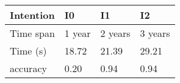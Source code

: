 \begin{tabular}{llll}
\toprule
Intention & I0 & I1 & I2 \\
\midrule
Time span & 1 year & 2 years & 3 years \\
Time (s) & 18.72 & 21.39 & 29.21 \\
accuracy & 0.20 & 0.94 & 0.94 \\
\bottomrule
\end{tabular}
